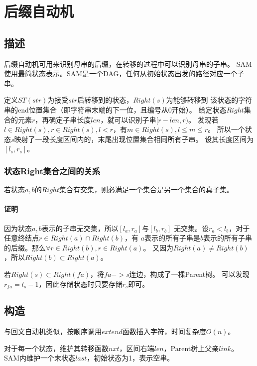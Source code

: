 \section{后缀自动机}
\subsection{描述}
后缀自动机可用来识别母串的后缀，在转移的过程中可以识别母串的子串。
SAM使用最简状态表示。SAM是一个DAG，任何从初始状态出发的路径对应一个子串。

定义$ST(str)$为接受$str$后转移到的状态，$Right(s)$为能够转移到
该状态的字符串的end位置集合（即字符串末端的下一位，且编号从0开始）。
给定状态$Right$集合的元素$r$，再确定子串长度$len$，就可以识别子串$[r-len,r)$。
发现若$l\in Right(s),r\in Right(s),l<r$，有$m\in Right(s),l\leq m \leq r$。
所以一个状态$s$映射了一段长度区间内的，末尾出现位置集合相同所有子串。
设其长度区间为$[l_s,r_s]$。

\subsubsection{状态Right集合之间的关系}
\begin{property}
若状态$a,b$的$Right$集合有交集，则必满足一个集合是另一个集合的真子集。
\end{property}
\paragraph{证明} 因为状态$a,b$表示的子串无交集，所以$[l_a,r_a]$与$[l_b,r_b]$
无交集。设$r_a<l_b$，对于任意终结点$r\in Right(a) \cap Right(b)$，有
$a$表示的所有子串是$b$表示的所有子串的后缀。那么$\forall r\in Right(b),r\in Right(a)$。
又因为$Right(a)\neq Right(b)$，所以$Right(b) \subset Right(a)$。

若$Right(s)\subset Right(fa)$，将$fa->s$连边，构成了一棵Parent树。
可以发现$r_{fa}=l_s-1$，因此存储状态时只要存储$r_s$即可。
\subsection{构造}
与回文自动机类似，按顺序调用$extend$函数插入字符，时间复杂度$O(n)$。

对于每一个状态，维护其转移函数$nxt$，区间右端$len$，Parent树上父亲$link$。
SAM内维护一个末状态$last$，初始状态为1，表示空串。

